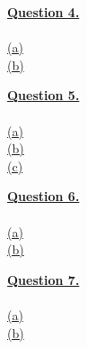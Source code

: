 \documentclass[12pt]{article}
\begin{document}
{\LARGE \underline{\textbf{Question 4.}}}\\
~\\\hyperlink{toc}{\hypertarget{4.1}{(a)}}
~\\\hyperlink{toc}{\hypertarget{4.2}{(b)}}
\newpage

{\LARGE \underline{\textbf{Question 5.}}}\\
~\\\hyperlink{toc}{\hypertarget{5.1}{(a)}}
~\\\hyperlink{toc}{\hypertarget{5.2}{(b)}}
~\\\hyperlink{toc}{\hypertarget{5.3}{(c)}}
\newpage

{\LARGE \underline{\textbf{Question 6.}}}\\
~\\\hyperlink{toc}{\hypertarget{6.1}{(a)}}
~\\\hyperlink{toc}{\hypertarget{6.2}{(b)}}
\newpage

{\LARGE \underline{\textbf{Question 7.}}}\\
~\\\hyperlink{toc}{\hypertarget{7.1}{(a)}}
~\\\hyperlink{toc}{\hypertarget{7.2}{(b)}}
\end{document}
